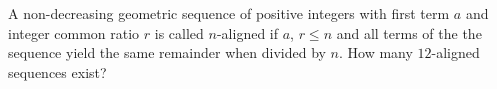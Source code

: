 A non-decreasing geometric sequence of positive integers with first term $a$ and integer common ratio $r$ is called $n$-aligned if $a$, $r\leq n$ and all terms of the the sequence yield the same remainder when divided by $n$. How many $12$-aligned sequences exist?
